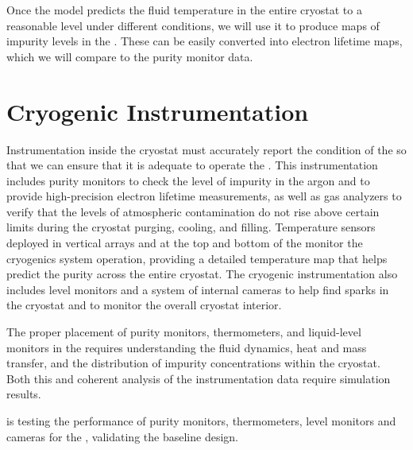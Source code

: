 Once the   model %
predicts the fluid temperature in the entire cryostat to a reasonable level under different conditions, we will use it %
to produce maps of impurity levels in the . These can be easily converted into electron lifetime maps, which we will %
compare to the %
 purity monitor data. 


\section{Cryogenic Instrumentation}
\label{sec:fdgen-cryo-instr}
Instrumentation inside the cryostat must accurately report the condition of the  so that we can ensure that it is adequate to operate the .
This instrumentation includes %
purity monitors %
to check the level of impurity in the argon and %
to provide high-precision electron lifetime measurements,
as well as gas analyzers to verify that the levels of atmospheric contamination do not rise above %
certain limits during the cryostat purging, cooling, and filling. 
Temperature sensors deployed in vertical arrays and at the top and bottom of the  monitor the cryogenics system operation, providing a 
detailed \threed temperature map that helps predict the  purity across the entire cryostat. The cryogenic instrumentation also includes  level monitors and
a system of internal cameras to help find sparks in the cryostat and %
to monitor the overall cryostat interior. 

The proper placement of purity monitors, thermometers, and liquid-level monitors in the  requires %
understanding the  fluid dynamics, heat and mass transfer, and the distribution of impurity concentrations within the cryostat. %
Both this and %
coherent analysis of the instrumentation data require  simulation results.

 is testing the performance of 
purity monitors, thermometers, level monitors and cameras
for the , validating the baseline  %
design.





